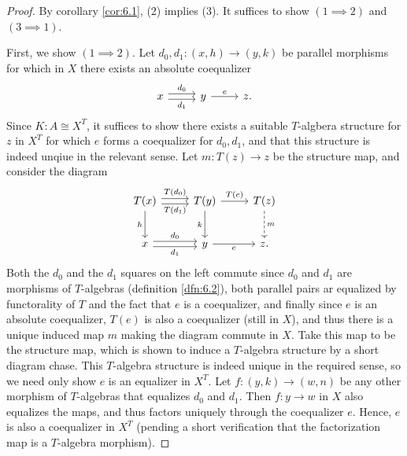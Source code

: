 \begin{proof}
	By corollary \ref{cor:6.1}, (2) implies (3). It suffices to show $(1\implies 2)$ and $(3\implies 1)$.

	First, we show $(1\implies 2)$. Let $d_0,d_1 : (x,h) \to (y,k)$ be parallel morphisms for which in $X$ there exists an absolute coequalizer
	\[\begin{tikzcd}[row sep = 2.5em, column sep = 2.5em]
	x\ar[" d_0 ", shift left, r] \ar[" d_1 "', shift right, r]  & y\ar[" e ", r]  & z.
	\end{tikzcd}\]
	Since $K : A \cong X^T$, it suffices to show there exists a suitable $T$-algbera structure for $z$ in $X^T$ for which $e$ forms a coequalizer for $d_0,d_1$, and that this structure is indeed unqiue in the relevant sense. Let $m : T(z) \to z$ be the structure map, and consider the diagram
	\[\begin{tikzcd}[row sep = 2.5em, column sep = 2.5em]
	T(x) \ar[" T(d_0) ", shift left, r] \ar[" T(d_1) "', shift right, r] \ar[" h "', d]  & T(y)\ar[" T(e) ", r] \ar[" k "', d]  & T(z)\ar[" m ", dashed, d]  \\
	x \ar[" d_0 ", shift left, r] \ar[" d_1 "', shift right, r]  & y\ar[" e "', r]  & z.
	\end{tikzcd}\]
	Both the $d_0$ and the $d_1$ squares on the left commute since $d_0$ and $d_1$ are morphisms of $T$-algebras (definition \ref{dfn:6.2}), both parallel pairs ar equalized by functorality of $T$ and the fact that $e$ is a coequalizer, and finally since $e$ is an absolute coequalizer, $T(e)$ is also a coequalizer (still in $X$), and thus there is a unique induced map $m$ making the diagram commute in $X$. Take this map to be the structure map, which is shown to induce a $T$-algebra structure by a short diagram chase. This $T$-algebra structure is indeed unique in the required sense, so we need only show $e$ is an equalizer in $X^T$. Let $f : (y,k) \to (w,n)$ be any other morphism of $T$-algebras that equalizes $d_0$ and $d_1$. Then $f : y \to w$ in $X$ also equalizes the maps, and thus factors uniquely through the coequalizer $e$. Hence, $e$ is also a coequalizer in $X^T$ (pending a short verification that the factorization map is a $T$-algebra morphism).


\end{proof}
